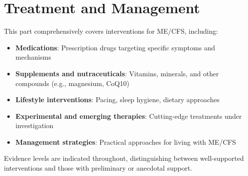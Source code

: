 \part{Treatment and Management}
\label{part:treatment}

This part comprehensively covers interventions for ME/CFS, including:

\begin{itemize}
\item \textbf{Medications}: Prescription drugs targeting specific symptoms and mechanisms
\item \textbf{Supplements and nutraceuticals}: Vitamins, minerals, and other compounds (e.g., magnesium, CoQ10)
\item \textbf{Lifestyle interventions}: Pacing, sleep hygiene, dietary approaches
\item \textbf{Experimental and emerging therapies}: Cutting-edge treatments under investigation
\item \textbf{Management strategies}: Practical approaches for living with ME/CFS
\end{itemize}

Evidence levels are indicated throughout, distinguishing between well-supported interventions and those with preliminary or anecdotal support.

